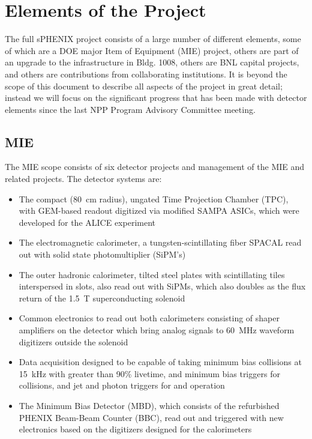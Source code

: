 \section{Elements of the Project}
\label{sec:elements}

The full sPHENIX project consists of a large number of different
elements, some of which are a DOE major Item of Equipment (MIE) project,
others are part of an
upgrade to the infrastructure in Bldg. 1008, others are BNL capital
projects, and others are contributions from collaborating
institutions.  It is beyond the scope of this document to describe all
aspects of the project in great detail; instead we will focus on
the significant progress that has been made with detector elements
since the last NPP Program Advisory Committee meeting.

\subsection{MIE}

The MIE scope consists of six detector projects and management of the
MIE and related projects.  The detector systems are:

\begin{itemize}
\item The compact (80~cm radius), ungated Time Projection Chamber
  (TPC), with GEM-based readout digitized via modified SAMPA ASICs,
  which were developed for the ALICE experiment
    \item The electromagnetic calorimeter, a tungsten-scintillating fiber
    SPACAL read out with solid state photomultiplier (SiPM's)
  \item The outer hadronic calorimeter, tilted steel plates with
    scintillating tiles interspersed in slots, also read out with
    SiPMs, which also doubles as the flux return of the 1.5~T
    superconducting solenoid
  \item Common electronics to read out both calorimeters consisting of
    shaper amplifiers on the detector which bring analog signals to
    60~MHz waveform digitizers outside the solenoid
    \item Data acquisition designed to be capable of taking minimum bias
    \AuAu collisions at 15~kHz with greater than 90\% livetime, and
    minimum bias triggers for \AuAu collisions, and jet and photon
    triggers for \pp and \pA operation 
  \item The Minimum Bias Detector (MBD), which consists of the
    refurbished PHENIX Beam-Beam Counter (BBC), read out and triggered
    with new electronics based on the digitizers designed for the
    calorimeters
\end{itemize}


